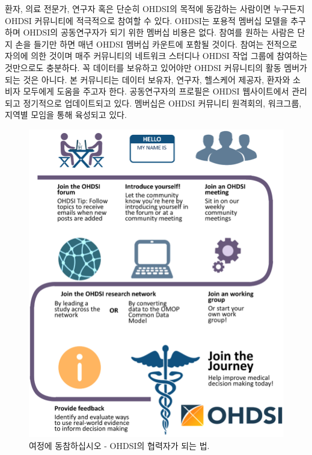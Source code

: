 \documentclass[10.5pt]{book}
\theoremstyle{definition}
\theoremstyle{definition}
\theoremstyle{definition}
\theoremstyle{remark}
\begin{document}
환자, 의료 전문가, 연구자 혹은 단순히 OHDSI의 목적에 동감하는 사람이면
누구든지 OHDSI 커뮤니티에 적극적으로 참여할 수 있다. OHDSI는 포용적
멤버십 모델을 추구하며 OHDSI의 공동연구자가 되기 위한 멤버십 비용은
없다. 참여를 원하는 사람은 단지 손을 들기만 하면 매년 OHDSI 멤버십
카운트에 포함될 것이다. 참여는 전적으로 자의에 의한 것이며 매주
커뮤니티의 네트워크 스터디나 OHDSI 작업 그룹에 참여하는 것만으로도
충분하다. 꼭 데이터를 보유하고 있어야만 OHDSI 커뮤니티의 활동 멤버가
되는 것은 아니다. 본 커뮤니티는 데이터 보유자, 연구자, 헬스케어 제공자,
환자와 소비자 모두에게 도움을 주고자 한다. 공동연구자의 프로필은 OHDSI
웹사이트에서 관리되고 정기적으로 업데이트되고 있다. 멤버십은 OHDSI
커뮤니티 원격회의, 워크그룹, 지역별 모임을 통해 육성되고 있다.
  

\begin{figure}

{\centering \includegraphics[width=0.9\linewidth]{images/WhereToBegin/joinTheJourney} 

}

\caption{여정에 동참하십시오 - OHDSI의 협력자가 되는 법.}\label{fig:jointhejourney}
\end{figure}
\end{document}
